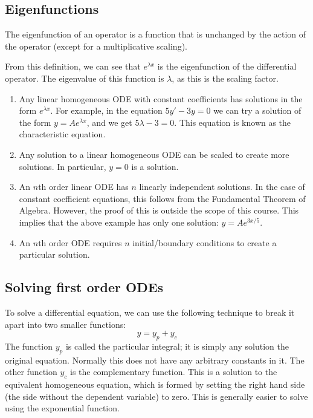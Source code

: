 \subsection{Eigenfunctions}
\begin{definition}
	The eigenfunction of an operator is a function that is unchanged by the action of the operator (except for a multiplicative scaling).
\end{definition}
From this definition, we can see that \(e^{\lambda x}\) is the eigenfunction of the differential operator.
The eigenvalue of this function is \(\lambda\), as this is the scaling factor.
\begin{enumerate}
	\item Any linear homogeneous ODE with constant coefficients has solutions in the form \(e^{\lambda x}\).
	      For example, in the equation \(5y' - 3y = 0\) we can try a solution of the form \(y = Ae^{\lambda x}\), and we get \(5 \lambda - 3 = 0\).
	      This equation is known as the characteristic equation.
	\item Any solution to a linear homogeneous ODE can be scaled to create more solutions.
	      In particular, \(y=0\) is a solution.
	\item An \(n\)th order linear ODE has \(n\) linearly independent solutions.
	      In the case of constant coefficient equations, this follows from the Fundamental Theorem of Algebra.
	      However, the proof of this is outside the scope of this course.
	      This implies that the above example has only one solution: \(y = Ae^{3x/5}\).
	\item An \(n\)th order ODE requires \(n\) initial/boundary conditions to create a particular solution.
\end{enumerate}

\subsection{Solving first order ODEs}
To solve a differential equation, we can use the following technique to break it apart into two smaller functions:
\[
	y = y_p + y_c
\]
The function \(y_p\) is called the particular integral; it is simply any solution
the original equation.
Normally this does not have any arbitrary constants in it.
The other function \(y_c\) is the complementary function.
This is a solution to the equivalent homogeneous equation, which is formed by setting the right hand side (the side without the dependent variable) to zero.
This is generally easier to solve using the exponential function.

